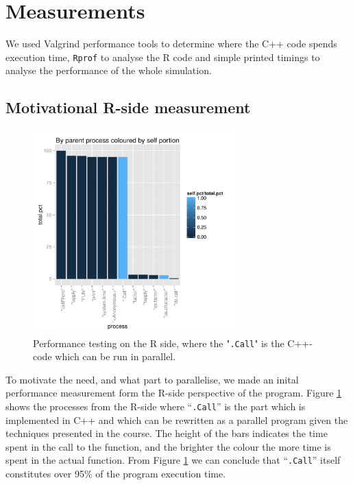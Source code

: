 

\section{Measurements}

We used Valgrind performance tools to determine where the C++ code
spends execution time, \texttt{Rprof} to analyse the R code and simple
printed timings to analyse the performance of the whole simulation. 

\subsection{Motivational R-side measurement}

\begin{figure}[!htbp] \centering
  \includegraphics[width=0.7\textwidth]{images/parentColByPortion.pdf}
  \caption{Performance testing on the R side, where the "\texttt{.Call}" is the
C++-code which can be run in parallel.}
  \label{fig:rMot}
\end{figure}

To motivate the need, and what part to parallelise, we made an inital
performance measurement form the R-side perspective of the
program. Figure \ref{fig:rMot} shows the processes from the R-side
where ``\texttt{.Call}'' is the part which is implemented in C++ and which can
be rewritten as a parallel program given the techniques presented in
the course. The height of the bars indicates the time spent in the
call to the function, and the brighter the colour the more
time is spent in the actual function. From Figure \ref{fig:rMot} we
can conclude that ``\texttt{.Call}'' itself constitutes over 95\% of the
program execution time.

